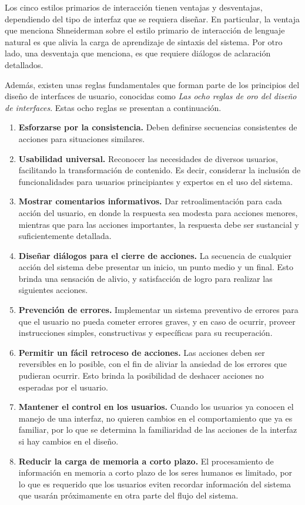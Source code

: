 Los cinco estilos primarios de interacción tienen ventajas y desventajas, dependiendo del tipo de interfaz que se requiera diseñar. En particular, la ventaja que menciona Shneiderman sobre el estilo primario de interacción de lenguaje natural es que alivia la carga de aprendizaje de sintaxis del sistema. Por otro lado, una desventaja que menciona, es que requiere diálogos de aclaración detallados.

Además, existen unas reglas fundamentales que forman parte de los principios del diseño de interfaces de usuario, conocidas como \textit{Las ocho reglas de oro del diseño de interfaces}. Estas ocho reglas se presentan a continuación.

\begin{enumerate}
  \item \textbf{Esforzarse por la consistencia.} Deben definirse secuencias consistentes de acciones para situaciones similares.
  \item \textbf{Usabilidad universal.} Reconocer las necesidades de diversos usuarios, facilitando la transformación de contenido. Es decir, considerar la inclusión de funcionalidades para usuarios principiantes y expertos en el uso del sistema.
  \item \textbf{Mostrar comentarios informativos.} Dar retroalimentación para cada acción del usuario, en donde la respuesta sea modesta para acciones menores, mientras que para las acciones importantes, la respuesta debe ser sustancial y suficientemente detallada.
  \item \textbf{Diseñar diálogos para el cierre de acciones.} La secuencia de cualquier acción del sistema debe presentar un inicio, un punto medio y un final. Esto brinda una sensación de alivio, y satisfacción de logro para realizar las siguientes acciones.
  \item \textbf{Prevención de errores.} Implementar un sistema preventivo de errores para que el usuario no pueda cometer errores graves, y en caso de ocurrir, proveer instrucciones simples, constructivas y específicas para su recuperación.
  \item \textbf{Permitir un fácil retroceso de acciones.} Las acciones deben ser reversibles en lo posible, con el fin de aliviar la ansiedad de los errores que pudieran ocurrir. Esto brinda la posibilidad de deshacer acciones no esperadas por el usuario.
  \item \textbf{Mantener el control en los usuarios.} Cuando los usuarios ya conocen el manejo de una interfaz, no quieren cambios en el comportamiento que ya es familiar, por lo que se determina la familiaridad de las acciones de la interfaz si hay cambios en el diseño.
  \item \textbf{Reducir la carga de memoria a corto plazo.} El procesamiento de información en memoria a corto plazo de los seres humanos es limitado, por lo que es requerido que los usuarios eviten recordar información del sistema que usarán próximamente en otra parte del flujo del sistema.
\end{enumerate}

